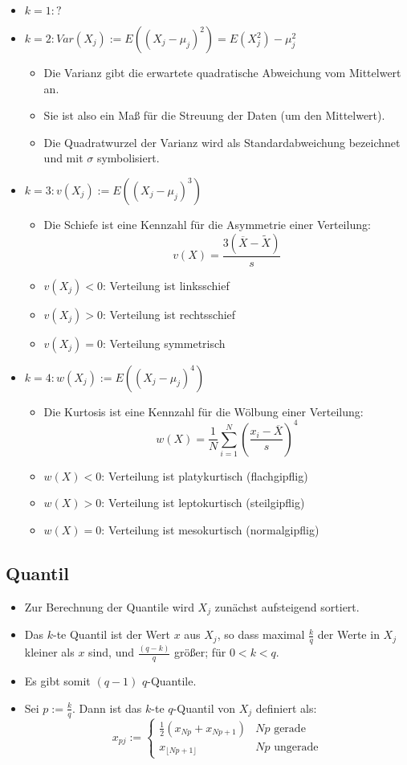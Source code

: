 \documentclass{scrartcl}
\begin{document}
\begin{itemize}
	\item $ k=1:? $
	\item $ k=2:Var(X_j) := E((X_j - \mu_j)^2) = E(X_j^2) - \mu_j^2 $
	\[  \]
	\begin{itemize}
		\item Die Varianz gibt die erwartete quadratische Abweichung vom 
		Mittelwert an.
		\item Sie ist also ein Maß für die Streuung der Daten (um den 
		Mittelwert).
		\item Die Quadratwurzel der Varianz wird als Standardabweichung 
		bezeichnet und mit $ \sigma $ symbolisiert.
	\end{itemize}
	\item $ k=3:v(X_j) := E((X_j - \mu_j)^3) $
	\begin{itemize}
		\item Die Schiefe ist eine Kennzahl für die Asymmetrie einer Verteilung:
		\[ v(X) = \frac{3(\overline{X} - \tilde{X})}{s} \]
		\item $ v(X_j) < 0 $: Verteilung ist linksschief
		\item $ v(X_j) > 0 $: Verteilung ist rechtsschief
		\item $ v(X_j) = 0 $: Verteilung symmetrisch
	\end{itemize}
	\item $ k=4:w(X_j) := E((X_j - \mu_j)^4) $
	\begin{itemize}
		\item Die Kurtosis ist eine Kennzahl für die Wölbung einer Verteilung:
		\[ w(X) = \frac{1}{N} \sum_{i=1}^{N} (\frac{x_i - \overline{X}}{s})^4 \]
		\item $ w(X) < 0 $: Verteilung ist platykurtisch (flachgipflig)
		\item $ w(X) > 0 $: Verteilung ist leptokurtisch (steilgipflig)
		\item $ w(X) = 0 $: Verteilung ist mesokurtisch (normalgipflig)
	\end{itemize}
\end{itemize}

\subsection{Quantil}

\begin{itemize}
	\item Zur Berechnung der Quantile wird $ X_j $ zunächst aufsteigend 
	sortiert.
	\item Das $ k $-te Quantil ist der Wert $ x $ aus $ X_j $, so dass maximal 
	$ \frac{k}{q} $ der Werte in $ X_j $ kleiner als $ x $ sind, und $ 
	\frac{(q-k)}{q} $ größer; für $ 0<k<q $.
	\item Es gibt somit $ (q-1) $ $ q $-Quantile.
	\item Sei $ p := \frac{k}{q} $. Dann ist das $ k $-te $ q $-Quantil von $ 
	X_j $ definiert als:
	\[ x_{pj} := \begin{cases}
		\frac{1}{2} (x_{Np} + x_{Np+1}) & Np \text{ gerade} \\
		x_{\lfloor Np+1 \rfloor} & Np \text{ ungerade}
	\end{cases} \]
\end{itemize}
\end{document}
